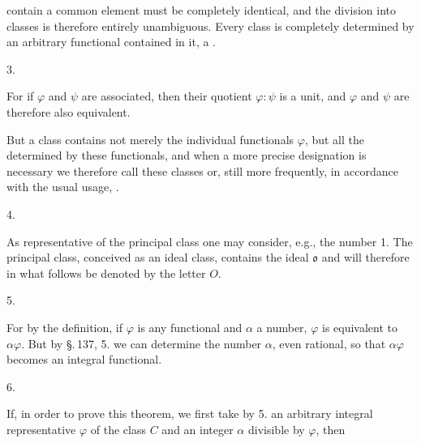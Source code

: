 contain a common element must be completely identical, and the division into classes is therefore entirely unambiguous. Every class is completely determined by an arbitrary functional contained in it, a .

3. 

For if $\varphi$ and $\psi$ are associated, then their quotient $\varphi:\psi$ is a unit, and $\varphi$ and $\psi$ are therefore also equivalent.

But a class contains not merely the individual functionals $\varphi$, but all the  determined by these functionals, and when a more precise designation is necessary we therefore call these classes  or, still more frequently, in accordance with the usual usage, .

4. 

As representative of the principal class one may consider, e.g., the number 1. The principal class, conceived as an ideal class, contains the ideal $\mathfrak{o}$ and will therefore in what follows be denoted by the letter $O$.

5. 

For by the definition, if $\varphi$ is any functional and $\alpha$ a number, $\varphi$ is equivalent to $\alpha\varphi$. But by \S.\,137, 5. we can determine the number $\alpha$, even rational, so that $\alpha\varphi$ becomes an integral functional.

6. 

If, in order to prove this theorem, we first take by 5. an arbitrary integral representative $\varphi$ of the class $C$ and an integer $\alpha$ divisible by $\varphi$, then

